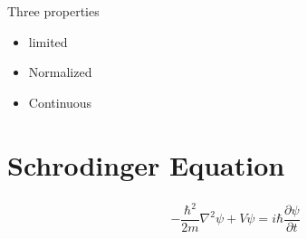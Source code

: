 Three properties

\begin{itemize}
\item limited
\item Normalized
\item Continuous
\end{itemize}

\section{Schrodinger Equation}

\begin{equation*}
  \begin{aligned}
    - \dfrac{\hbar^2}{2 m} \nabla^2 \psi + V \psi = i \hbar \dfrac{\partial \psi}{\partial t}  
  \end{aligned}
\end{equation*}






